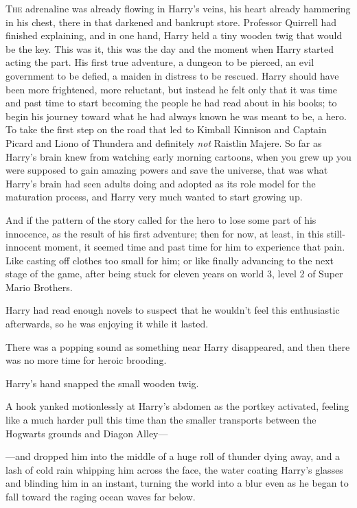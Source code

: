 
\lettrine{T}{he} adrenaline was already flowing in Harry’s veins, his heart already hammering in his chest, there in that darkened and bankrupt store. Professor Quirrell had finished explaining, and in one hand, Harry held a tiny wooden twig that would be the key. This was it, this was the day and the moment when Harry started acting the part. His first true adventure, a dungeon to be pierced, an evil government to be defied, a maiden in distress to be rescued. Harry should have been more frightened, more reluctant, but instead he felt only that it was time and past time to start becoming the people he had read about in his books; to begin his journey toward what he had always known he was meant to be, a hero. To take the first step on the road that led to Kimball Kinnison and Captain Picard and Liono of Thundera and definitely \emph{not} Raistlin Majere. So far as Harry’s brain knew from watching early morning cartoons, when you grew up you were supposed to gain amazing powers and save the universe, that was what Harry’s brain had seen adults doing and adopted as its role model for the maturation process, and Harry very much wanted to start growing up.

And if the pattern of the story called for the hero to lose some part of his innocence, as the result of his first adventure; then for now, at least, in this still-innocent moment, it seemed time and past time for him to experience that pain. Like casting off clothes too small for him; or like finally advancing to the next stage of the game, after being stuck for eleven years on world 3, level 2 of Super Mario Brothers.

Harry had read enough novels to suspect that he wouldn’t feel this enthusiastic afterwards, so he was enjoying it while it lasted.

There was a popping sound as something near Harry disappeared, and then there was no more time for heroic brooding.

Harry’s hand snapped the small wooden twig.

A hook yanked motionlessly at Harry’s abdomen as the portkey activated, feeling like a much harder pull this time than the smaller transports between the Hogwarts grounds and Diagon Alley—

—and dropped him into the middle of a huge roll of thunder dying away, and a lash of cold rain whipping him across the face, the water coating Harry’s glasses and blinding him in an instant, turning the world into a blur even as he began to fall toward the raging ocean waves far below.

